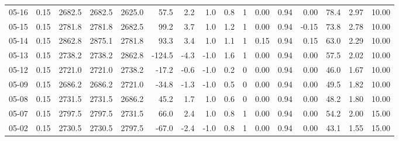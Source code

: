 \begin{threeparttable}
{\begin{tabular}{lrrrrrrrrrrrrrrr}
  05-16 &     0.15 & 2682.5 & 2682.5 & 2625.0 &       57.5 &            2.2 &                      1.0 &                 0.8 &              1 &       0.00 &      0.94 &           0.00 &             78.4 &            2.97 &                  10.00 \\
  05-15 &     0.15 & 2781.8 & 2781.8 & 2682.5 &       99.2 &            3.7 &                      1.0 &                 1.2 &              1 &       0.00 &      0.94 &          -0.15 &             73.8 &            2.78 &                  10.00 \\
  05-14 &     0.15 & 2862.8 & 2875.1 & 2781.8 &       93.3 &            3.4 &                      1.0 &                 1.1 &              1 &       0.15 &      0.94 &           0.15 &             63.0 &            2.29 &                  10.00 \\
  05-13 &     0.15 & 2738.2 & 2738.2 & 2862.8 &     -124.5 &           -4.3 &                     -1.0 &                 1.6 &              1 &       0.00 &      0.94 &           0.00 &             57.5 &            2.02 &                  10.00 \\
  05-12 &     0.15 & 2721.0 & 2721.0 & 2738.2 &      -17.2 &           -0.6 &                     -1.0 &                 0.2 &              0 &       0.00 &      0.94 &           0.00 &             46.0 &            1.67 &                  10.00 \\
  05-09 &     0.15 & 2686.2 & 2686.2 & 2721.0 &      -34.8 &           -1.3 &                     -1.0 &                 0.5 &              0 &       0.00 &      0.94 &           0.00 &             49.5 &            1.82 &                  10.00 \\
  05-08 &     0.15 & 2731.5 & 2731.5 & 2686.2 &       45.2 &            1.7 &                      1.0 &                 0.6 &              0 &       0.00 &      0.94 &           0.00 &             48.2 &            1.80 &                  10.00 \\
  05-07 &     0.15 & 2797.5 & 2797.5 & 2731.5 &       66.0 &            2.4 &                      1.0 &                 0.8 &              1 &       0.00 &      0.94 &           0.00 &             54.2 &            2.00 &                  15.00 \\
  05-02 &     0.15 & 2730.5 & 2730.5 & 2797.5 &      -67.0 &           -2.4 &                     -1.0 &                 0.8 &              1 &       0.00 &      0.94 &           0.00 &             43.1 &            1.55 &                  15.00 \\

\end{tabular}}
\end{threeparttable}
